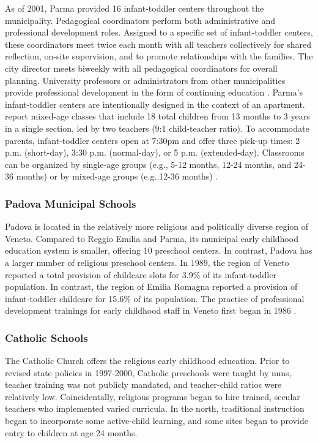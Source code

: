 As of 2001, Parma provided 16 infant-toddler centers throughout the municipality. Pedagogical coordinators perform both administrative and professional development roles. Assigned to a specific set of infant-toddler centers, these coordinators meet twice each month with all teachers collectively for shared reflection, on-site supervision, and to promote relationships with the families. The city director meets biweekly with all pedagogical coordinators for overall planning. University professors or administrators from other municipalities provide professional development in the form of continuing education \citep{Terzi-Cantarelli_2001_Parma}. Parma's infant-toddler centers are intentionally designed in the context of an apartment. \citet{Terzi-Cantarelli_2001_Parma} report mixed-age classes that include 18 total children from 13 months to 3 years in a single section, led by two teachers (9:1 child-teacher ratio). To accommodate parents, infant-toddler centers open at 7:30pm and offer three pick-up times: 2 p.m. (short-day), 3:30 p.m. (normal-day), or 5 p.m. (extended-day). Classrooms can be organized by single-age groups (e.g., 5-12 months, 12-24 months, and 24-36 months) or by mixed-age groups (e.g.,12-36 months) \citep{Majorano-etal_2009_CC-in-P}.

\subsubsection{Padova Municipal Schools}

Padova is located in the relatively more religious and politically diverse region of Veneto. Compared to Reggio Emilia and Parma, its municipal early childhood education system is smaller, offering 10 preschool centers. In contrast, Padova has a larger number of religious preschool centers. In 1989, the region of Veneto reported a total provision of childcare slots for 3.9\% of its infant-toddler population. In contrast, the region of Emilia Romagna reported a provision of infant-toddler childcare for 15.6\% of its population. The practice of professional development trainings for early childhood staff in Veneto first began in 1986 \citep{Becchi-Ferrari_1990_Pub-Inf-Centres-Italy}.

\subsubsection{Catholic Schools}

The Catholic Church offers the religious early childhood education. Prior to revised state policies in 1997-2000, Catholic preschools were taught by nuns, teacher training was not publicly mandated, and teacher-child ratios were relatively low. Coincidentally, religious programs began to hire trained, secular teachers who implemented varied curricula. In the north, traditional instruction began to incorporate some active-child learning, and some sites began to provide entry to children at age 24 months.

